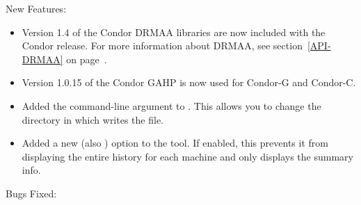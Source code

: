 \noindent New Features:

\begin{itemize}

\item Version 1.4 of the Condor DRMAA libraries are now included 
  with the Condor release.
  For more information about DRMAA, see section~\ref{API-DRMAA} on
  page~\pageref{API-DRMAA}.

\item Version 1.0.15 of the Condor GAHP is now used for Condor-G and
  Condor-C. 

\item Added the  command-line argument to
.  This allows you to change the directory in which
 writes the  file.

\item Added a new  (also ) option to the
 tool.  If enabled, this prevents it from
displaying the entire history for each machine and only displays the
summary info.

\end{itemize}

\noindent Bugs Fixed:

